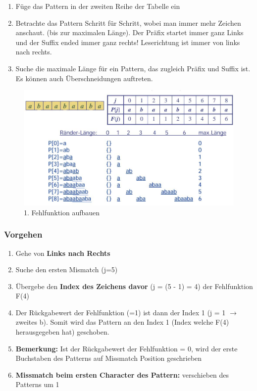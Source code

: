 \begin{enumerate}
	\item Füge das Pattern in der zweiten Reihe der Tabelle ein
	\item Betrachte das Pattern Schritt für Schritt, wobei man immer mehr Zeichen anschaut. (bis zur maximalen Länge). Der Präfix startet immer ganz Links und der Suffix ended immer ganz rechts! Leserichtung ist immer von links nach rechts.
	\item Suche die maximale Länge für ein Pattern, das zugleich Präfix und Suffix ist. Es können auch Überschneidungen auftreten.
\end{enumerate}

\begin{figure}[h]
\centering
\includegraphics[width=0.9\linewidth]{images/fehlfunktion}
\caption{1. Fehlfunktion aufbauen}
\label{fig:fehlfunktion}
\end{figure}

\clearpage

\subsubsection{Vorgehen}
\begin{enumerate}
	\item Gehe von \textbf{Links nach Rechts}
	\item Suche den ersten Mismatch (j=5)
	\item Übergebe den \textbf{Index des Zeichens davor} (j = (5 - 1) = 4) der Fehlfunktion F(4)
	\item Der Rückgabewert der Fehlfunktion (=1) ist dann der Index 1 (j = 1 $\rightarrow$ zweites b). Somit wird das Pattern an den Index 1 (Index welche F(4) herausgegeben hat) geschoben.
	\item \textbf{Bemerkung:} Ist der Rückgabewert der Fehlfunktion = 0, wird der erste Buchstaben des Patterns auf Missmatch Position geschrieben
	\item \textbf{Missmatch beim ersten Character des Pattern:} verschieben des Patterns um 1
\end{enumerate}

